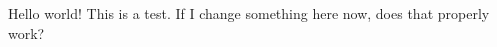 \documentclass{report}
\begin{document}
	Hello world! This is a test. If I change something here now, does that properly work?
\end{document}
